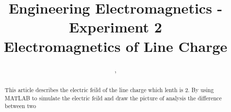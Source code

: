 \documentclass[10pt, journal]{IEEEtran}
\begin{document}
\title{Engineering Electromagnetics - Experiment 2\\ Electromagnetics of Line Charge}
\author{, 
\\
        
}

\maketitle


\begin{abstract}
    This article describes the electric feild of the line charge which lenth is 2.
    By using MATLAB to simulate the electric feild and draw the picture of 
    analysis the difference between two  
\end{abstract}
\end{document}
